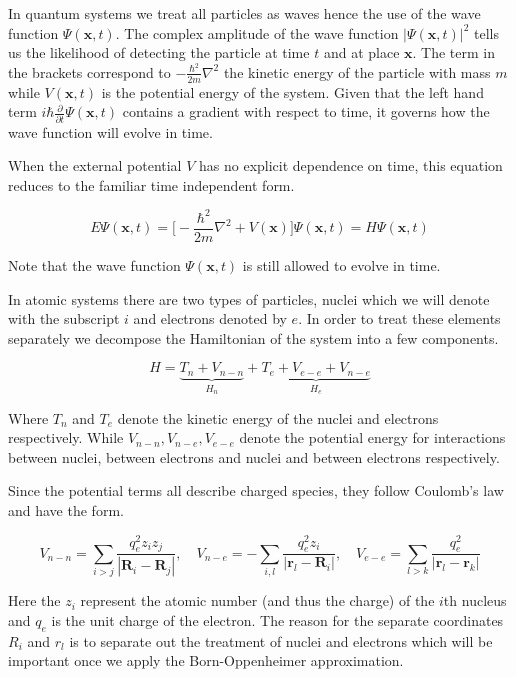 In quantum systems we treat all particles as waves hence the use of the wave function $\Psi (\textbf{x},t)$. The complex amplitude of the wave function $|\Psi (\textbf {x}, t)|^2$ tells us the likelihood of detecting the particle at time $t$ and at place $\textbf{x}$. The term in the brackets correspond to $-\frac{\hbar ^2}{2m}\nabla^2 $ the kinetic energy of the particle with mass $m$ while $V (\textbf{x}, t)$ is the potential energy of the system. Given that the left hand term $i\hbar \frac {\partial}{\partial t} \Psi (\textbf{x},t)$ contains a gradient with respect to time, it governs how the wave function will evolve in time.

When the external potential $V$ has no explicit dependence on time, this equation reduces to the familiar time independent form. 

\begin{equation}
	E \Psi (\textbf{x}, t) = \big[ -\frac{\hbar ^2}{2m}\nabla^2 + V (\textbf{x}) \big] \Psi (\textbf{x}, t) = H \Psi(\textbf{x}, t) 
 \end{equation}

Note that the wave function $\Psi (\textbf {x}, t)$ is still allowed to evolve in time. 

In atomic systems there are two types of particles, nuclei which we will denote with the subscript $i$ and electrons denoted by $e$. In order to treat these elements separately we decompose the Hamiltonian of the system into a few components. 

\begin {equation}
H = \underbrace{T_n + V_{n-n}}_{H_n} + \underbrace{T_e +  V_{e-e} + V_{n-e}}_{H_e}
\end {equation}

Where $T_n$ and $T_e$ denote the kinetic energy of the nuclei and electrons respectively. While $V_{n-n}, V_{n-e}, V_{e-e}$ denote the potential energy for interactions between nuclei, between electrons and nuclei and between electrons respectively.

Since the potential terms all describe charged species, they follow Coulomb's law and have the form.

\begin{equation}
	V_{n-n} = \sum_{i>j} \frac{q_e^2 z_i z_j }{|\textbf{R}_i-\textbf{R}_j|},\quad V_{n-e} = -\sum_{i,l} \frac{q_e^2 z_i }{|\textbf{r}_l-\textbf{R}_i|},\quad  V_{e-e}  = \sum_{l>k} \frac{q_e^2 }{|\textbf{r}_l-\textbf{r}_k|}
\end{equation}

Here the $z_i$ represent the atomic number (and thus the charge) of the $i$th nucleus and $q_e$ is the unit charge of the electron. The reason for the separate coordinates $R_i$ and $r_l$ is to separate out the treatment of nuclei and electrons which will be important once we apply the Born-Oppenheimer approximation.

